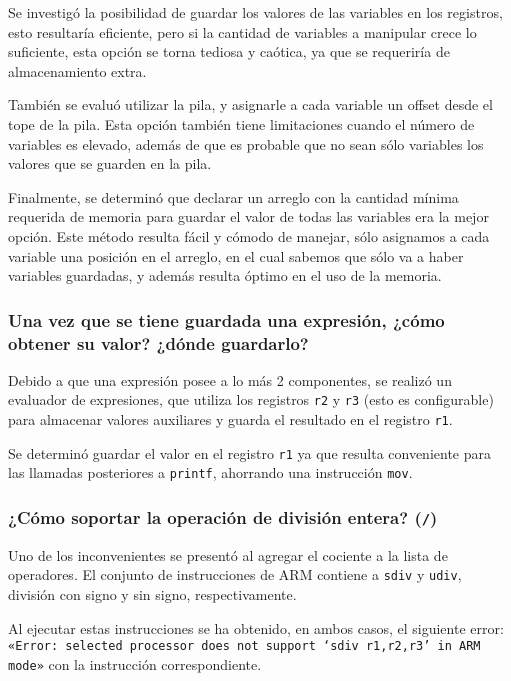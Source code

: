\documentclass[12pt,spanish]{article}
\begin{document}
Se investigó la posibilidad de guardar los valores de las variables en los registros, esto resultaría eficiente, pero si la cantidad de variables a manipular crece lo suficiente, esta opción se torna tediosa y caótica, ya que se requeriría de almacenamiento extra.

También se evaluó utilizar la pila, y asignarle a cada variable un offset desde el tope de la pila. Esta opción también tiene limitaciones cuando el número de variables es elevado, además de que es probable que no sean sólo variables los valores que se guarden en la pila.

Finalmente, se determinó que declarar un arreglo con la cantidad mínima requerida de memoria para guardar el valor de todas las variables era la mejor opción. Este método resulta fácil y cómodo de manejar, sólo asignamos a cada variable una posición en el arreglo, en el cual sabemos que sólo va a haber variables guardadas, y además resulta óptimo en el uso de la memoria.

\subsubsection{Una vez que se tiene guardada una expresión, ¿cómo obtener su valor? ¿dónde guardarlo?}

Debido a que una expresión posee a lo más 2 componentes, se realizó un evaluador de expresiones, que utiliza los registros \texttt{r2} y \texttt{r3} (esto es configurable) para almacenar valores auxiliares y guarda el resultado en el registro \texttt{r1}.

Se determinó guardar el valor en el registro \texttt{r1} ya que resulta conveniente para las llamadas posteriores a \texttt{printf}, ahorrando una instrucción \texttt{mov}.

\subsubsection{¿Cómo soportar la operación de división entera? (\texttt{/})}

Uno de los inconvenientes se presentó al agregar el cociente a la lista de operadores. El conjunto de instrucciones de ARM contiene a \texttt{sdiv} y \texttt{udiv}, división con signo y sin signo, respectivamente. 

Al ejecutar estas instrucciones se ha obtenido, en ambos casos, el siguiente error: \texttt{«Error: selected processor does not support `sdiv r1,r2,r3' in ARM mode»} con la instrucción correspondiente.
\end{document}
